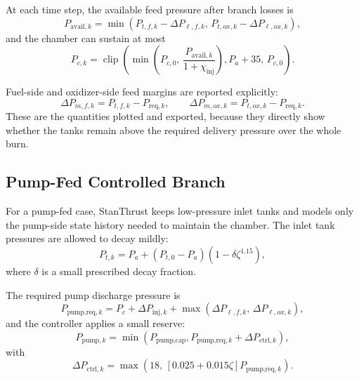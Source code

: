 \documentclass[11pt]{article}
\newcommand{\clip}{\operatorname{clip}}
\begin{document}
At each time step, the available feed pressure after branch losses is
\begin{equation}
P_{\text{avail},k}
=
\min\!\left(
P_{t,f,k}-\Delta P_{\ell,f,k},\,
P_{t,ox,k}-\Delta P_{\ell,ox,k}
\right),
\label{eq:feed-available-pressure}
\end{equation}
and the chamber can sustain at most
\begin{equation}
P_{c,k}
=
\clip\!\left(
\min\!\left(P_{c,0},\,\frac{P_{\text{avail},k}}{1+\chi_{\text{inj}}}\right),
P_a+35,\,
P_{c,0}
\right).
\label{eq:pressure-fed-chamber-tailoff}
\end{equation}

Fuel-side and oxidizer-side feed margins are reported explicitly:
\begin{equation}
\Delta P_{m,f,k}=P_{t,f,k}-P_{\text{req},k},
\qquad
\Delta P_{m,ox,k}=P_{t,ox,k}-P_{\text{req},k}.
\label{eq:pressure-fed-margins}
\end{equation}
These are the quantities plotted and exported, because they directly show whether the tanks remain above the required delivery pressure over the whole burn.

\subsection{Pump-Fed Controlled Branch}
For a pump-fed case, StanThrust keeps low-pressure inlet tanks and models only the pump-side state history needed to maintain the chamber.
The inlet tank pressures are allowed to decay mildly:
\begin{equation}
P_{t,k}
=
P_a + (P_{t,0}-P_a)\left(1-\delta\zeta^{1.15}\right),
\label{eq:pump-inlet-decay}
\end{equation}
where $\delta$ is a small prescribed decay fraction.

The required pump discharge pressure is
\begin{equation}
P_{\text{pump,req},k}
=
P_c+\Delta P_{\text{inj},k}
+
\max\!\left(\Delta P_{\ell,f,k},\,\Delta P_{\ell,ox,k}\right),
\label{eq:pump-required-discharge}
\end{equation}
and the controller applies a small reserve:
\begin{equation}
P_{\text{pump},k}
=
\min\!\left(
P_{\text{pump,cap}},
P_{\text{pump,req},k}+\Delta P_{\text{ctrl},k}
\right),
\label{eq:pump-discharge-control}
\end{equation}
with
\begin{equation}
\Delta P_{\text{ctrl},k}
=
\max\!\left(18,\,
\left[0.025+0.015\zeta\right]P_{\text{pump,req},k}
\right).
\label{eq:pump-control-reserve}
\end{equation}
\end{document}

